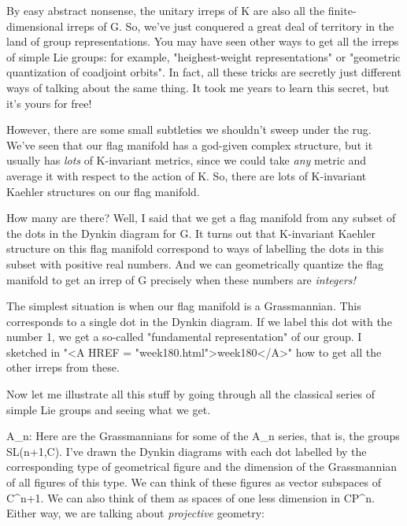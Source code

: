 By easy abstract nonsense, the unitary irreps of K are also all the
finite-dimensional irreps of G.  So, we've just conquered a great deal
of territory in the land of group representations.  You may have seen
other ways to get all the irreps of simple Lie groups: for example,
"heighest-weight representations" or "geometric quantization of
coadjoint orbits".  In fact, all these tricks are secretly just
different ways of talking about the same thing.  It took me years 
to learn this secret, but it's yours for free!  

However, there are some small subtleties we shouldn't sweep under the
rug.  We've seen that our flag manifold has a god-given complex
structure, but it usually has \emph{lots} of K-invariant metrics, since we
could take \emph{any} metric and average it with respect to the action of K. 
So, there are lots of K-invariant Kaehler structures on our flag manifold.

How many are there?  Well, I said that we get a flag manifold from any
subset of the dots in the Dynkin diagram for G.  It turns out that
K-invariant Kaehler structure on this flag manifold correspond to ways
of labelling the dots in this subset with positive real numbers.  And 
we can geometrically quantize the flag manifold to get an irrep of G
precisely when these numbers are \emph{integers!}

The simplest situation is when our flag manifold is a Grassmannian.
This corresponds to a single dot in the Dynkin diagram.  If we label
this dot with the number 1, we get a so-called "fundamental
representation" of our group.  I sketched in "<A HREF = "week180.html">week180</A>" how to get all
the other irreps from these.

Now let me illustrate all this stuff by going through all the classical
series of simple Lie groups and seeing what we get.  

A_{n}: Here are the Grassmannians for some of the A_{n} series,
that is, the groups SL(n+1,C).  I've drawn the Dynkin diagrams with each
dot labelled by the corresponding type of geometrical figure and the
dimension of the Grassmannian of all figures of this type.  We can think
of these figures as vector subspaces of C^{n+1}.  We can also think of
them as spaces of one less dimension in CP^{n}.  Either way, we are
talking about \emph{projective} geometry:




